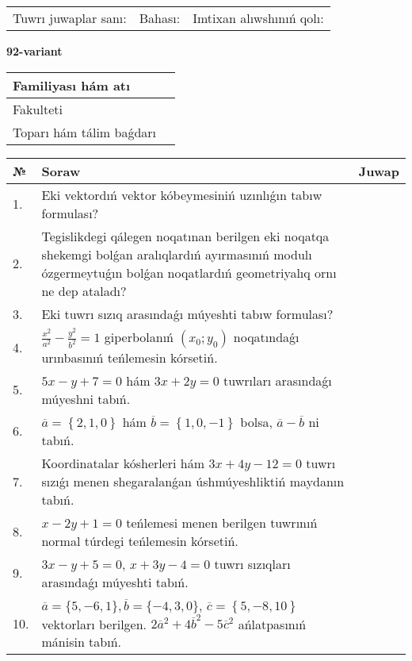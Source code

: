 \documentclass{article}
\begin{document}
\vspace{1cm}

\begin{tabular}{lll}
Tuwrı juwaplar sanı: \underline{\hspace{1.5cm}} & 
Bahası: \underline{\hspace{1.5cm}} & 
Imtixan alıwshınıń qolı: \underline{\hspace{2cm}} \\
\end{tabular}

\egroup

\newpage


\textbf{92-variant}\\

\bgroup
\def\arraystretch{1.6} %

\begin{tabular}{|m{5.7cm}|m{9.5cm}|}
\hline
Familiyası hám atı & \\
\hline
Fakulteti  & \\
\hline
Toparı hám tálim baǵdarı  & \\
\hline
\end{tabular}

\vspace{1cm}

\begin{tabular}{|m{0.7cm}|m{10cm}|m{4cm}|}
\hline
№ & Soraw & Juwap \\
\hline
1. & Eki vektordıń vektor kóbeymesiniń uzınlıǵın tabıw formulası? &  \\
\hline
2. & Tegislikdegi qálegen noqatınan berilgen eki noqatqa shekemgi bolǵan aralıqlardıń ayırmasınıń modulı ózgermeytuǵın bolǵan noqatlardıń geometriyalıq ornı ne dep ataladı? &  \\
\hline
3. & Eki tuwrı sızıq arasındaǵı múyeshti tabıw formulası? &  \\
\hline
4. & $\frac{x^2}{a^2}-\frac{y^2}{b^2}=1$ giperbolanıń $(x_0;y_0)$ noqatındaǵı urınbasınıń teńlemesin kórsetiń. &  \\
\hline
5. & $5x-y+7=0$ hám $3x+2y=0$ tuwrıları arasındaǵı múyeshni tabıń. &  \\
\hline
6. & $\overline{a}=\left\{ 2, 1, 0 \right\}$ hám $\overline{b}=\left\{ 1, 0,-1 \right\}$ bolsa, $\overline{a}-\overline{b}$ ni tabıń. &  \\
\hline
7. & Koordinatalar kósherleri hám $ 3x+4y-12=0 $ tuwrı sızıǵı menen shegaralanǵan úshmúyeshliktiń maydanın tabıń. &  \\
\hline
8. & $x-2y+1=0$ teńlemesi menen berilgen tuwrınıń normal túrdegi teńlemesin kórsetiń. &  \\
\hline
9. & $3x-y+5=0$, $x+3y-4=0$ tuwrı sızıqları arasındaǵı múyeshti tabıń. &  \\
\hline
10. & $\overline{a}=\{5,-6, 1 \}, \overline{b}=\{-4, 3, 0 \} $, $\overline{c}=\left\{ 5,-8, 10 \right\}$ vektorları berilgen. $2{\overline{a}}^{2}+4{\overline{b}}^{2}-5{\overline{c}}^{2}$ ańlatpasınıń mánisin tabıń. &  \\
\hline
\end{tabular}
\end{document}
